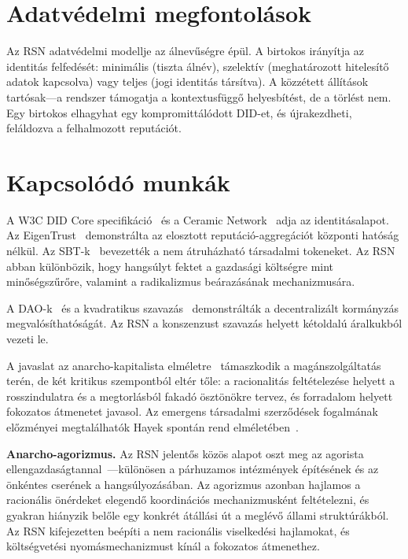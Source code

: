 \documentclass[11pt,a4paper,twocolumn]{article}
\begin{document}
\section{Adatvédelmi megfontolások}

Az RSN adatvédelmi modellje az álnevűségre épül. A birtokos irányítja az identitás felfedését: minimális (tiszta álnév), szelektív (meghatározott hitelesítő adatok kapcsolva) vagy teljes (jogi identitás társítva). A közzétett állítások tartósak---a rendszer támogatja a kontextusfüggő helyesbítést, de a törlést nem. Egy birtokos elhagyhat egy kompromittálódott DID-et, és újrakezdheti, feláldozva a felhalmozott reputációt.

\section{Kapcsolódó munkák}

A W3C DID Core specifikáció~\cite{did2022} és a Ceramic Network~\cite{ceramic2023} adja az identitásalapot. Az EigenTrust~\cite{kamvar2003} demonstrálta az elosztott reputáció-aggregációt központi hatóság nélkül. Az SBT-k~\cite{weyl2022} bevezették a nem átruházható társadalmi tokeneket. Az RSN abban különbözik, hogy hangsúlyt fektet a gazdasági költségre mint minőségszűrőre, valamint a radikalizmus beárazásának mechanizmusára.

A DAO-k~\cite{buterin2014} és a kvadratikus szavazás~\cite{buterin2019} demonstrálták a decentralizált kormányzás megvalósíthatóságát. Az RSN a konszenzust szavazás helyett kétoldalú áralkukból vezeti le.

A javaslat az anarcho-kapitalista elméletre~\cite{rothbard1973,hoppe2001} támaszkodik a magánszolgáltatás terén, de két kritikus szempontból eltér tőle: a racionalitás feltételezése helyett a rosszindulatra és a megtorlásból fakadó ösztönökre tervez, és forradalom helyett fokozatos átmenetet javasol. Az emergens társadalmi szerződések fogalmának előzményei megtalálhatók Hayek spontán rend elméletében~\cite{hayek1973}.

\textbf{Anarcho-agorizmus.} Az RSN jelentős közös alapot oszt meg az agorista ellengazdaságtannal~\cite{konkin2006}---különösen a párhuzamos intézmények építésének és az önkéntes cserének a hangsúlyozásában. Az agorizmus azonban hajlamos a racionális önérdeket elegendő koordinációs mechanizmusként feltételezni, és gyakran hiányzik belőle egy konkrét átállási út a meglévő állami struktúrákból. Az RSN kifejezetten beépíti a nem racionális viselkedési hajlamokat, és költségvetési nyomásmechanizmust kínál a fokozatos átmenethez.
\end{document}
